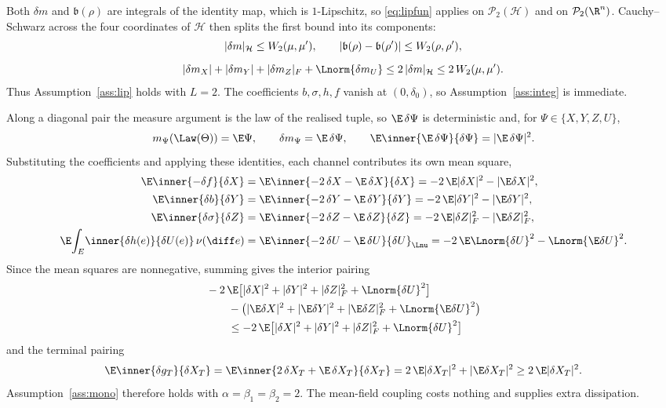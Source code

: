 \begin{example}
Both $\delta m$ and $\mathfrak b(\rho)$ are integrals of the identity map, which is
$1$-Lipschitz, so \eqref{eq:lipfun} applies on $\mathcal P_2(\mathcal H)$ and on
$\mathcal P_2(\R^n)$. Cauchy--Schwarz across the four coordinates of $\mathcal H$ then splits
the first bound into its components:
\[
\begin{gathered}
|\delta m|_{\mathcal H}\le W_2(\mu,\mu') ,\qquad
|\mathfrak b(\rho)-\mathfrak b(\rho')|\le W_2(\rho,\rho') ,\\[1.4ex]
|\delta m_X|+|\delta m_Y|+|\delta m_Z|_F+\Lnorm{\delta m_U}
\le 2\,|\delta m|_{\mathcal H}\le 2\,W_2(\mu,\mu') .
\end{gathered}
\]
Thus Assumption~\ref{ass:lip} holds with $L=2$. The coefficients $b,\sigma,h,f$ vanish at $(0,\delta_0)$, so Assumption~\ref{ass:integ} is
immediate.

Along a diagonal pair the measure argument is the law of the realised tuple, so
$\E\,\delta\Psi$ is deterministic and, for $\Psi\in\{X,Y,Z,U\}$,
\[
m_\Psi(\Law(\Theta))=\E\Psi,\qquad
\delta m_\Psi=\E\,\delta\Psi,\qquad
\E\inner{\E\,\delta\Psi}{\delta\Psi}=|\E\,\delta\Psi|^2 .
\]
Substituting the coefficients and applying these identities, each channel contributes its own
mean square,
\[
\begin{aligned}
\E\inner{-\delta f}{\delta X}
&=\E\inner{-2\,\delta X-\E\,\delta X}{\delta X}=-2\,\E|\delta X|^2-|\E\delta X|^2,\\
\E\inner{\delta b}{\delta Y}
&=\E\inner{-2\,\delta Y-\E\,\delta Y}{\delta Y}=-2\,\E|\delta Y|^2-|\E\delta Y|^2,\\
\E\inner{\delta\sigma}{\delta Z}
&=\E\inner{-2\,\delta Z-\E\,\delta Z}{\delta Z}=-2\,\E|\delta Z|_F^2-|\E\delta Z|_F^2,\\
\E\!\int_E\!\inner{\delta h(e)}{\delta U(e)}\,\nu(\diff e)
&=\E\inner{-2\,\delta U-\E\,\delta U}{\delta U}_{\Lnu}
=-2\,\E\Lnorm{\delta U}^2-\Lnorm{\E\delta U}^2 .
\end{aligned}
\]
Since the mean squares are nonnegative, summing gives the interior pairing
\[
\begin{aligned}
&-2\,\E\big[|\delta X|^2+|\delta Y|^2+|\delta Z|_F^2+\Lnorm{\delta U}^2\big]\\
&\qquad-\big(|\E\delta X|^2+|\E\delta Y|^2+|\E\delta Z|_F^2+\Lnorm{\E\delta U}^2\big)\\
&\qquad\le-2\,\E\big[|\delta X|^2+|\delta Y|^2+|\delta Z|_F^2+\Lnorm{\delta U}^2\big]
\end{aligned}
\]
and the terminal pairing
\[
\E\inner{\delta g_T}{\delta X_T}
=\E\inner{2\,\delta X_T+\E\,\delta X_T}{\delta X_T}
=2\,\E|\delta X_T|^2+|\E\delta X_T|^2
\ge2\,\E|\delta X_T|^2 .
\]
Assumption~\ref{ass:mono} therefore holds with $\alpha=\beta_1=\beta_2=2$. The mean-field
coupling costs nothing and supplies extra dissipation.


\end{example}
